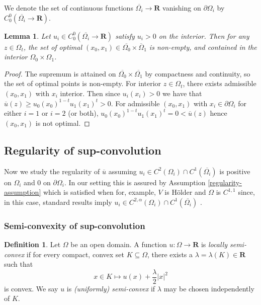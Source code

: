 \documentclass[12pt]{amsart}
\newtheorem{lem}[thm]{Lemma}
\newenvironment{pf}{\begin{proof}}{\end{proof}}
\theoremstyle{definition}
\newtheorem{defn}[thm]{Definition}
\theoremstyle{remark}
\begin{document}
We denote the set of continuous functions \(\overline{\Omega_i} \to \mathbf{R}\) vanishing on
\(\partial \Omega_i\) by \(C^0_0(\overline{\Omega_i} \to \mathbf{R})\).

\begin{lem}
  \label{org2260c5a} Let \(u_i \in C^0_0(\overline{\Omega_i} \to \mathbf{R})\) satisfy \(u_i > 0\)
on the interior.  Then for any \(z \in \Omega_t\), the set of optimal \((x_0, x_1) \in
\overline{\Omega_0} \times \overline{\Omega}_1\) is non-empty, and contained in the interior
\(\Omega_0 \times \Omega_1\).
\end{lem}

\begin{pf} The supremum is attained on \(\overline{\Omega_0} \times \overline{\Omega_1}\) by
compactness and continuity, so the set of optimal points is non-empty.
For interior \(z \in \Omega_t\), there exists admissible
\((x_0, x_1)\) with \(x_i\) interior.  Then since \(u_i(x_i) > 0\) we have that
\(\overline{u}(z) \geq u_0(x_0)^{1-t} u_1(x_1)^t > 0\). For admissible \((x_0,
x_1)\) with \(x_i \in \partial \Omega_i\) for either \(i = 1\) or \(i = 2\) (or both),
\(u_0(x_0)^{1-t}u_1(x_1)^t = 0 < \overline{u}(z)\) hence \((x_0, x_1)\) is not
optimal.
\end{pf}

\subsection{Regularity of sup-convolution}
\label{sec:org166c3b2}

Now we study the regularity of $\overline{u}$ assuming $u_i \in C^2(\Omega_i) \cap C^{1}(\overline{\Omega_i})$ is positive on $\Omega_i$ and $0$ on $\partial \Omega_i$. In our setting this is assured by Assumption \ref{regularity-assumption} which is satisfied when for, example, $V$ is H\"older and $\Omega$ is $C^{1,1}$ since, in this case, standard  results imply $u_i \in C^{2,\alpha}(\Omega_i) \cap C^{1}(\overline{\Omega_i})$ \cite[Lemma 6.16, Theorem 9.15]{MR1814364}.
\subsubsection{Semi-convexity of sup-convolution}
\label{sec:org33bf5d3}

\begin{defn} Let \(\Omega\) be an open domain. A function \(u : \Omega \to \mathbf{R}\) is
  \emph{locally semi-convex} if for every compact, convex set \(K \subseteq \Omega\),
  there exists a \(\lambda = \lambda(K) \in \mathbf{R}\) such that
  \[ x \in K \mapsto u(x) + \frac{\lambda}{2}|x|^2
  \] is convex. We say \(u\) is \emph{(uniformly) semi-convex} if \(\lambda\) may be
chosen independently of \(K\).
\end{defn}
\end{document}
